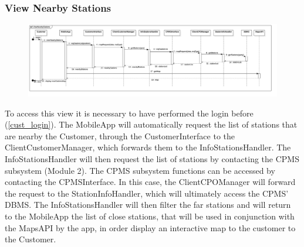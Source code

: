 \subsubsection{View Nearby Stations}\label{nearby_stations}
\begin{figure}[H]
    \begin{center}
        \includegraphics[width=\textwidth]{img/runtime/nearby_stations}
    \end{center}
\end{figure}
To access this view it is necessary to have performed the login before (\ref{cust_login}). The MobileApp will automatically request the list of stations that are nearby the Customer, through the CustomerInterface to the ClientCustomerManager, which forwards them to the InfoStationsHandler. The InfoStationsHandler will then request the list of stations by contacting the CPMS subsystem (Module 2). The CPMS subsystem functions can be accessed by contacting the CPMSInterface. In this case, the ClientCPOManager will forward the request to the StationInfoHandler, which will ultimately access the CPMS' DBMS. The InfoStationsHandler will then filter the far stations and will return to the MobileApp the list of close stations, that will be used in conjunction with the MapsAPI by the app, in order display an interactive map to the customer to the Customer.
